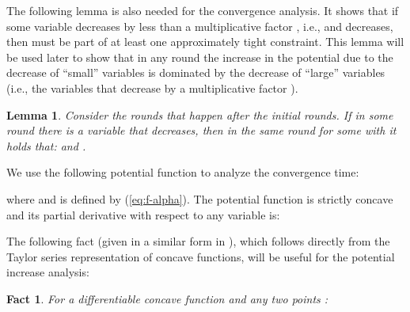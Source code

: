 \documentclass[11pt]{article}
\makeatletter
\newtheorem{lemma}[theorem]{Lemma}
\newtheorem{fact}[theorem]{Fact}
\renewcommand{\paragraph}{\@startsection{paragraph}{4}{\z@}{1ex \@plus 1ex \@minus .2ex}{-.5em}{\normalfont\normalsize\bfseries}}
\newif\iffullpaper
\makeatother
\begin{document}
The following lemma is also needed for the convergence analysis. It shows that if some variable   decreases by less than a multiplicative factor , i.e.,  and  decreases, then  must be part of at least one approximately tight constraint. This lemma will be used later to show that in any round the increase in the potential due to the decrease of ``small'' variables is dominated by the decrease of ``large'' variables (i.e., the variables that decrease by a multiplicative factor ). 

\begin{lemma}\label{lemma:small-x-tight-yi}
Consider the rounds that happen after the initial  rounds. If in some round there is  a variable  that decreases, then in the same round for some  with  it holds that:  and .
\end{lemma}
\iffullpaper
\begin{proof}
Suppose that some  triggers a decrease over the  coordinate.
The first part of the Lemma is easy to show, simply by using the argument that at least one term of a summation must be higher than the average, i.e., there exists at least one  with  such that:


For the second part, as , we have that:


Since  decreases, we have that , and therefore  

Moreover, as , and , it follows that:

Observe that for :

while for , since :

where we have used the generalized Bernoulli's inequality for  \cite{mitrinovic1970analytic}, and then .
Recalling that , and combining (\ref{eq:y-bound-1}) with (\ref{eq:eps-8-1}) and (\ref{eq:eps-8-1-2}):

Finally, as , it follows that 

which gives:

\end{proof}
\fi
 
\paragraph{Potential.}

We use the following potential function to analyze the convergence time:

where  and  is defined by (\ref{eq:f-alpha}).
The potential function is strictly concave and its partial derivative with respect to any variable  is:


The following fact (given in a similar form in \cite{AwerbuchKhandekar2009}), which follows directly from the Taylor series representation of concave functions, will be useful for the potential increase analysis:
\begin{fact}\label{fact:taylor}
For a differentiable concave function  and any two points :

\end{fact}
\end{document}
